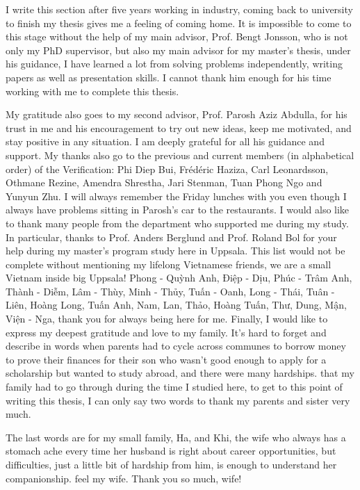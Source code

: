 
I write this section after five years working in industry, coming back to university to finish my thesis gives me a feeling of coming home. It is impossible to come to this stage without the help of my main advisor, Prof. Bengt Jonsson, who is not only my PhD supervisor, but also my main advisor for my master's thesis, under his guidance, I have learned a lot from solving problems independently, writing papers as well as presentation skills.  I cannot thank him enough for his time working with me to complete this thesis.

My gratitude also goes to my second advisor, Prof. Parosh Aziz Abdulla, for his trust in me and his encouragement to try out new ideas, keep me motivated, and stay positive in any situation. I am deeply grateful for all his guidance and support.
My thanks also go to the previous and current members (in alphabetical order) of the Verification: Phi Diep Bui, Frédéric Haziza, Carl Leonardsson, Othmane Rezine, Amendra Shrestha, Jari Stenman, Tuan Phong Ngo and Yunyun Zhu. I will always remember the Friday lunches with you even though I always have problems sitting in Parosh's car to the restaurants.
I would also like to thank many people from the department who supported me during my study. In particular, thanks to Prof. Anders Berglund and Prof. Roland Bol for your help during my master's program study here in Uppsala.
This list would not be complete without mentioning my lifelong Vietnamese friends, we are a small Vietnam inside big Uppsala! Phong - Quỳnh Anh, Điệp - Dịu, Phúc - Trâm Anh, Thành - Diễm,
Lâm - Thùy, Minh - Thủy, Tuấn - Oanh, Long - Thái, Tuân - Liên, Hoàng
Long, Tuấn Anh, Nam, Lan, Thảo, Hoàng Tuấn, Thư, Dung, Mận, Viện - Nga, thank you for always being here for me.
Finally, I would like to express my deepest gratitude and love to my family. It's hard to forget and describe in words when parents had to cycle across communes to borrow money to prove their finances for their son who wasn't good enough to apply for a scholarship but wanted to study abroad, and there were many hardships. that my family had to go through during the time I studied here, to get to this point of writing this thesis, I can only say two words to thank my parents and sister very much.

The last words are for my small family, Ha, and Khi, the wife who always has a stomach ache every time her husband is right about career opportunities, but difficulties, just a little bit of hardship from him, is enough to understand her companionship. feel my wife. Thank you so much, wife!

